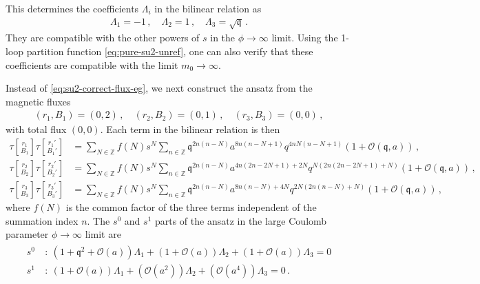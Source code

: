 \documentclass[11pt, a4paper]{article}
\newcommand{\tauftn}[2]{\tau\genfrac[]{0pt}{1}{#1}{#2}}
\theoremstyle{definition}
\begin{document}
This determines the coefficients $ \Lambda_i $ in the bilinear relation as
\begin{align}
    \Lambda_1 = -1 \, , \quad
    \Lambda_2 = 1 \, , \quad
    \Lambda_3 = \sqrt{\mathfrak{q}} \, .
\end{align}
They are compatible with the other powers of $ s $ in the $ \phi\to \infty $ limit. Using the 1-loop partition function \eqref{eq:pure-su2-unref}, one can also verify that these coefficients are compatible with the limit $ m_0 \to \infty $.

Instead of \eqref{eq:su2-correct-flux-eg}, we next construct the ansatz from the magnetic fluxes
\begin{align}\label{eq:su2-wrongflux}
    (r_1,B_1) = (0, 2) \, , \quad
    (r_2,B_2) = (0, 1) \, , \quad
    (r_3,B_3) = (0, 0) \, ,
\end{align}
with total flux $ (0,0) $. Each term in the bilinear relation is then
\begin{align}\label{eq:su2-wrong-bilinear}
        \tauftn{r_1}{B_1} \tauftn{r_1'}{B_1'} &= \sum_{N \in \mathbb{Z}} f(N) s^N \sum_{n\in \mathbb{Z}} \mathfrak{q}^{2n(n-N)} a^{8n(n-N+1)} q^{4nN(n-N+1)} (1+\mathcal{O}(\mathfrak{q},a)) \, , \\
        \tauftn{r_2}{B_2} \tauftn{r_2'}{B_2'} &= \sum_{N \in \mathbb{Z}} f(N) s^N \sum_{n\in \mathbb{Z}} \mathfrak{q}^{2n(n-N)} a^{4n(2n-2N+1)+2N} q^{N(2n(2n-2N+1)+N)} (1+\mathcal{O}(\mathfrak{q},a)) \, , \nonumber \\
        \tauftn{r_3}{B_3} \tauftn{r_3'}{B_3'} &= \sum_{N \in \mathbb{Z}} f(N) s^N \sum_{n\in \mathbb{Z}} \mathfrak{q}^{2n(n-N)} a^{8n(n-N)+4N} q^{2N(2n(n-N)+N)} (1+\mathcal{O}(\mathfrak{q},a)) \, , \nonumber
\end{align}
where $ f(N) $ is the common factor of the three terms independent of the summation index $ n $. The $ s^0 $ and $ s^1 $ parts of the ansatz in the large Coulomb parameter $ \phi \to \infty $ limit are
\begin{align}
    \begin{aligned}\label{eq:su2-wrongeq}
        s^0 \ &: \ \left(1+\mathfrak{q}^2 + \mathcal{O}(a) \right) \Lambda_1 + \left( 1 + \mathcal{O}(a) \right) \Lambda_2 + \left( 1 + \mathcal{O}(a) \right) \Lambda_3 = 0 \\
        s^1 \ &: \ \left(1+\mathcal{O}(a) \right) \Lambda_1 + \left( \mathcal{O}(a^2) \right) \Lambda_2 + \left( \mathcal{O}(a^4) \right) \Lambda_3 = 0 \, .
    \end{aligned}
\end{align}
\end{document}
